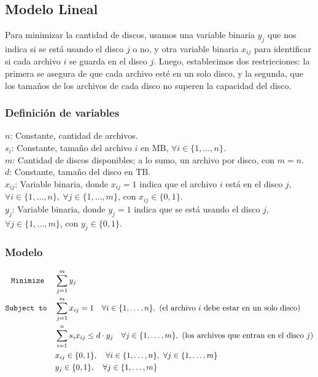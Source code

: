 \documentclass[11pt, a4paper, pdftex]{article}
\begin{document}
\subsection{Modelo Lineal}\label{modelo:primera:parte}

Para minimizar la cantidad de discos, usamos una variable binaria
$y_{j}$ que nos indica si se está usando el disco $j$ o no, y otra
variable binaria $x_{ij}$ para identificar si cada archivo $i$ se guarda
en el disco $j$. Luego, establecimos dos restricciones: la primera se
asegura de que cada archivo esté en un solo disco, y la segunda, que los
tamaños de los archivos de cada disco no superen la capacidad del disco.


\subsubsection{Definición de variables}

\noindent $n$: Constante, cantidad de archivos. \\

\noindent $s_{i}$: Constante, tamaño del archivo $i$ en $\text{MB}$, $\forall i \in \{1, \ldots, n\}$. \\

\noindent $m$: Cantidad de discos disponibles; a lo sumo, un archivo por disco, con $m = n$. \\

\noindent $d$: Constante, tamaño del disco en $\text{TB}$. \\ 

\noindent $x_{ij}$: Variable binaria, donde $x_{ij} = 1$ indica que el archivo $i$ está en el disco $j$, $\forall i \in \{1, \ldots, n\},\ \forall j \in \{1, \ldots, m\}$, con $x_{ij} \in \{0, 1\}$. \\

\noindent $y_{j}$: Variable binaria, donde $y_{j} = 1$ indica que se está usando el disco $j$, $\forall j \in \{1, \ldots, m\}$, con $y_{j} \in \{0, 1\}$. \\


\subsubsection{Modelo}

\begin{alignat*}{2}
	\texttt{Minimize}\quad\,\,
	& \sum_{j = 1}^{m} y_{j}\\
	\texttt{Subject to}\quad
	& \sum_{j = 1}^{m} x_{ij} = 1 \quad \forall i \in \{1, \ldots, n\},\ \text{(el archivo $i$ debe estar en un solo disco)}\\
	& \sum_{i = 1}^{n} s_{i} x_{ij} \le d\cdot y_{j} \quad \forall j \in \{1, \ldots, m\},\ \text{(los archivos que entran en el disco $j$)}\\
	& x_{ij} \in \{0,1\}, \quad \forall i \in \{1, \ldots, n\}, \ \forall j \in \{1, \ldots, m\}\\
	& y_{j} \in \{0,1\}, \quad \forall j \in \{1, \ldots, m\}
\end{alignat*}
\end{document}
